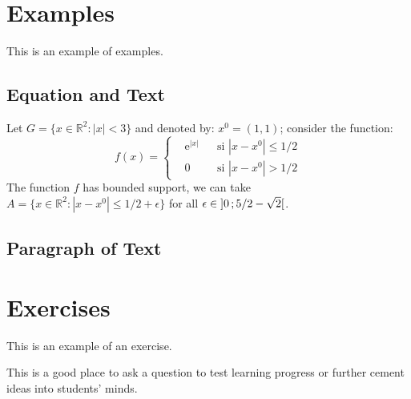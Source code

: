 \documentclass[11pt,fleqn,a5paper]{book} %
\begin{document}
    \section{Examples}
    
    This is an example of examples.
    
    \subsection{Equation and Text}
    
    \begin{example}
    Let $G=\{x\in\mathbb{R}^2:|x|<3\}$ and denoted by: $x^0=(1,1)$; consider the function:
    \begin{equation}
    f(x)=\left\{\begin{aligned} & \mathrm{e}^{|x|} & & \text{si $|x-x^0|\leq 1/2$}\\
    & 0 & & \text{si $|x-x^0|> 1/2$}\end{aligned}\right.
    \end{equation}
    The function $f$ has bounded support, we can take $A=\{x\in\mathbb{R}^2:|x-x^0|\leq 1/2+\epsilon\}$ for all $\epsilon\in\mathopen{]}0\,;5/2-\sqrt{2}\mathclose{[}$.
    \end{example}
    
    \subsection{Paragraph of Text}
    
    \begin{example}
    \lipsum[2]
    \end{example}
    
    
    \section{Exercises}
    
    This is an example of an exercise.
    
    \begin{exercise}
    This is a good place to ask a question to test learning progress or further cement ideas into students' minds.
    \end{exercise}
    
    
\end{document}
